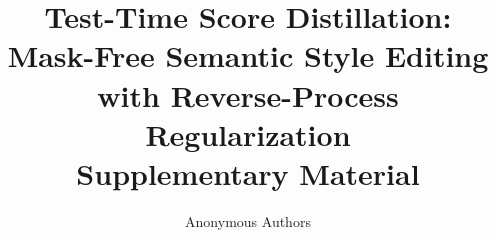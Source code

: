 \documentclass[10pt,twocolumn,letterpaper]{article}
\title{Test-Time Score Distillation: Mask-Free Semantic Style Editing with Reverse-Process Regularization\\Supplementary Material}
\author{Anonymous Authors}
\begin{document}
\maketitle

{\small}
\end{document}
